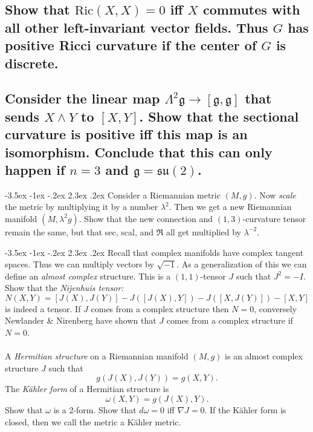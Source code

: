 \documentclass[10pt]{article}
\makeatletter
\renewcommand\section{\@startsection{section}{1}{\z@}%
                                  {-3.5ex \@plus -1ex \@minus -.2ex}%
                                  {2.3ex \@plus.2ex}%
                                  {\normalfont\large\bfseries}}
\newcommand{\ric}{\mbox{Ric}}
\makeatother
\begin{document}
\subsection{Show that $\ric(X,X) =0$ iff $X$ commutes with all other left-invariant vector fields. Thus $G$ has positive Ricci curvature if the center of $G$ is discrete.}
\subsection{Consider the linear map $\Lambda^2 \mathfrak{g} \to [\mathfrak{g} , \mathfrak{g}]$ that sends $X \wedge Y$ to $[X,Y]$. Show that the sectional curvature is positive iff this map is an isomorphism. Conclude that this can only happen if $n=3$ and $\mathfrak{g} = \mathfrak{su} (2)$.}


\section{Consider a Riemannian metric $(M,g)$. Now \emph{scale} the metric by multiplying it by a number $\lambda^2$. Then we get  a new Riemannian manifold $(M, \lambda^2 g)$. Show that the new connection and $(1,3)$-curvature tensor remain the same, but that sec, scal, and $\mathfrak{R}$ all get multiplied by $\lambda^{-2}$.}

\section{Recall that complex manifolds have complex tangent spaces. Thus we can multiply vectors by $\sqrt {-1}$. As a generalization of this we can define an \emph{almost complex} structure. This is a $(1,1)$-tensor $J$ such that $J^2 =-I$. Show that the \emph{Nijenhuis tensor:} $$N(X,Y) = [J(X), J(Y)] - J([J(X),Y])- J([X,J(Y)]) - [X,Y]$$ is indeed a tensor. If $J$ comes from a complex structure then $N=0$, conversely Newlander \& Nirenberg have shown that $J$ comes from a complex structure if $N=0$.\\\\A \emph{Hermitian  structure} on a Riemannian manifold $(M,g)$ is an almost complex structure $J$ such that $$g(J(X), J(Y)) = g(X,Y).$$ The \emph{K\"ahler form} of a Hermitian structure is $$\omega(X,Y) = g(J(X),Y).$$ Show that $\omega$ is a 2-form. Show that $d \omega =0$ iff $\nabla J=0$. If the K\"ahler form is closed, then we call the metric a K\"ahler metric.}
\end{document}

